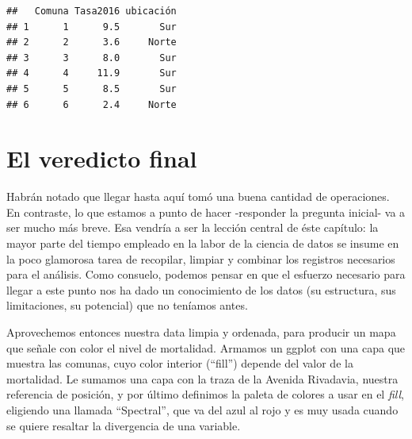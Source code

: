 \documentclass[spanish,]{book}
\newenvironment{Shaded}{\begin{snugshade}}{\end{snugshade}}
\newcommand{\DataTypeTok}[1]{\textcolor[rgb]{0.13,0.29,0.53}{#1}}
\newcommand{\KeywordTok}[1]{\textcolor[rgb]{0.13,0.29,0.53}{\textbf{#1}}}
\newcommand{\NormalTok}[1]{#1}
\newcommand{\OperatorTok}[1]{\textcolor[rgb]{0.81,0.36,0.00}{\textbf{#1}}}
\newcommand{\StringTok}[1]{\textcolor[rgb]{0.31,0.60,0.02}{#1}}
\begin{document}
\begin{verbatim}
##   Comuna Tasa2016 ubicación
## 1      1      9.5       Sur
## 2      2      3.6     Norte
## 3      3      8.0       Sur
## 4      4     11.9       Sur
## 5      5      8.5       Sur
## 6      6      2.4     Norte
\end{verbatim}

\hypertarget{el-veredicto-final}{%
\section{El veredicto final}\label{el-veredicto-final}}

Habrán notado que llegar hasta aquí tomó una buena cantidad de operaciones. En contraste, lo que estamos a punto de hacer -responder la pregunta inicial- va a ser mucho más breve. Esa vendría a ser la lección central de éste capítulo: la mayor parte del tiempo empleado en la labor de la ciencia de datos se insume en la poco glamorosa tarea de recopilar, limpiar y combinar los registros necesarios para el análisis. Como consuelo, podemos pensar en que el esfuerzo necesario para llegar a este punto nos ha dado un conocimiento de los datos (su estructura, sus limitaciones, su potencial) que no teníamos antes.

Aprovechemos entonces nuestra data limpia y ordenada, para producir un mapa que señale con color el nivel de mortalidad. Armamos un ggplot con una capa que muestra las comunas, cuyo color interior (``fill'') depende del valor de la mortalidad. Le sumamos una capa con la traza de la Avenida Rivadavia, nuestra referencia de posición, y por último definimos la paleta de colores a usar en el \emph{fill}, eligiendo una llamada ``Spectral'', que va del azul al rojo y es muy usada cuando se quiere resaltar la divergencia de una variable.

\begin{Shaded}
\end{Shaded}
\end{document}
